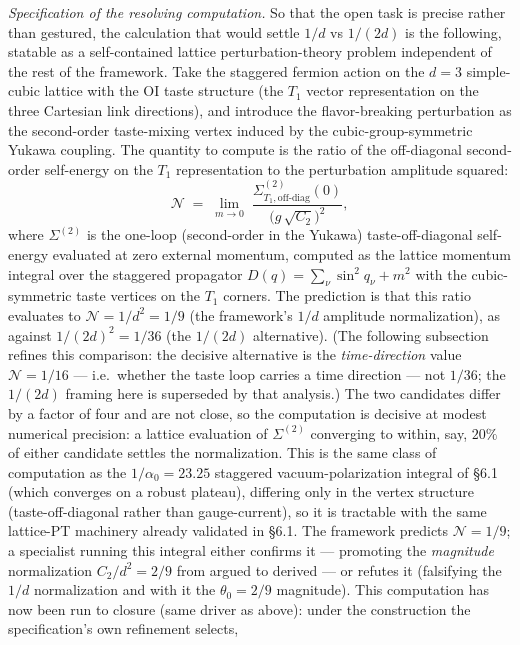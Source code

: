 \documentclass[
]{article}
\begin{document}
\emph{Specification of the resolving computation.} So that the open task
is precise rather than gestured, the calculation that would settle
\(1/d\) vs \(1/(2d)\) is the following, statable as a self-contained
lattice perturbation-theory problem independent of the rest of the
framework. Take the staggered fermion action on the \(d=3\) simple-cubic
lattice with the OI taste structure (the \(T_1\) vector representation
on the three Cartesian link directions), and introduce the
flavor-breaking perturbation as the second-order taste-mixing vertex
induced by the cubic-group-symmetric Yukawa coupling. The quantity to
compute is the ratio of the off-diagonal second-order self-energy on the
\(T_1\) representation to the perturbation amplitude squared:
\[ \mathcal{N} \;=\; \lim_{m\to 0}\; \frac{\Sigma^{(2)}_{T_1,\text{off-diag}}(0)}{\big(g\,\sqrt{C_2}\big)^2}, \]
where \(\Sigma^{(2)}\) is the one-loop (second-order in the Yukawa)
taste-off-diagonal self-energy evaluated at zero external momentum,
computed as the lattice momentum integral over the staggered propagator
\(D(q)=\sum_\nu \sin^2 q_\nu + m^2\) with the cubic-symmetric taste
vertices on the \(T_1\) corners. The prediction is that this ratio
evaluates to \(\mathcal{N} = 1/d^2 = 1/9\) (the framework's \(1/d\)
amplitude normalization), as against \(1/(2d)^2 = 1/36\) (the \(1/(2d)\)
alternative). (The following subsection refines this comparison: the
decisive alternative is the \emph{time-direction} value
\(\mathcal{N} = 1/16\) --- i.e.~whether the taste loop carries a time
direction --- not \(1/36\); the \(1/(2d)\) framing here is superseded by
that analysis.) The two candidates differ by a factor of four and are
not close, so the computation is decisive at modest numerical precision:
a lattice evaluation of \(\Sigma^{(2)}\) converging to within, say,
\(20\%\) of either candidate settles the normalization. This is the same
class of computation as the \(1/\alpha_0 = 23.25\) staggered
vacuum-polarization integral of §6.1 (which converges on a robust
plateau), differing only in the vertex structure (taste-off-diagonal
rather than gauge-current), so it is tractable with the same lattice-PT
machinery already validated in §6.1. The framework predicts
\(\mathcal{N} = 1/9\); a specialist running this integral either
confirms it --- promoting the \emph{magnitude} normalization
\(C_2/d^2 = 2/9\) from argued to derived --- or refutes it (falsifying
the \(1/d\) normalization and with it the \(\theta_0 = 2/9\) magnitude).
This computation has now been run to closure (same driver as above):
under the construction the specification's own refinement selects,
\end{document}
